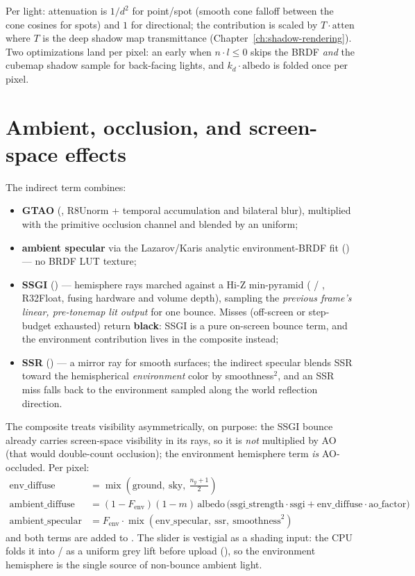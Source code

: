 Per light: attenuation is $1/d^2$ for point/spot (smooth cone falloff
between the cone cosines for spots) and $1$ for directional; the
contribution is scaled by $T \cdot \text{atten}$ where $T$ is the deep
shadow map transmittance (Chapter~\ref{ch:shadow-rendering}). Two optimizations
land per pixel: an early  when $n \cdot l \le 0$ skips the
BRDF \emph{and} the cubemap shadow sample for back-facing lights, and
$k_d \cdot \text{albedo}$ is folded once per pixel.

\section{Ambient, occlusion, and screen-space effects}

The indirect term combines:
\begin{itemize}
\item \textbf{GTAO} (, R8Unorm + temporal accumulation and
  bilateral blur), multiplied with the primitive occlusion channel and
  blended by an  uniform;
\item \textbf{ambient specular} via the Lazarov/Karis analytic
  environment-BRDF fit () --- no BRDF LUT texture;
\item \textbf{SSGI} () --- hemisphere rays marched
  against a Hi-Z min-pyramid ( /
  , R32Float, fusing hardware and volume depth),
  sampling the \emph{previous frame's linear, pre-tonemap lit output} for
  one bounce. Misses (off-screen or step-budget exhausted) return
  \textbf{black}: SSGI is a pure on-screen bounce term, and the
  environment contribution lives in the composite instead;
\item \textbf{SSR} () --- a mirror ray for smooth
  surfaces; the indirect specular blends SSR toward the hemispherical
  \emph{environment} color by smoothness$^2$, and an SSR miss falls back
  to the environment sampled along the world reflection direction.
\end{itemize}

The composite treats visibility asymmetrically, on purpose: the SSGI
bounce already carries screen-space visibility in its rays, so it is
\emph{not} multiplied by AO (that would double-count occlusion); the
environment hemisphere term \emph{is} AO-occluded. Per pixel:
\begin{align*}
\text{env\_diffuse} &= \operatorname{mix}(\text{ground},\ \text{sky},\
  \tfrac{n_y+1}{2}) \\
\text{ambient\_diffuse} &= (1{-}F_{\text{env}})(1{-}m)\,\text{albedo}\,
  \big(\text{ssgi\_strength}\cdot\text{ssgi} +
  \text{env\_diffuse}\cdot\text{ao\_factor}\big) \\
\text{ambient\_specular} &= F_{\text{env}}\cdot
  \operatorname{mix}(\text{env\_specular},\ \text{ssr},\
  \text{smoothness}^2)
\end{align*}
and both terms are added to . The  slider is
vestigial as a shading input: the CPU folds it into
\code{sky\_color}/\code{ground\_color} as a uniform grey lift before
upload (\code{render.rs}), so the environment hemisphere is the single
source of non-bounce ambient light.

